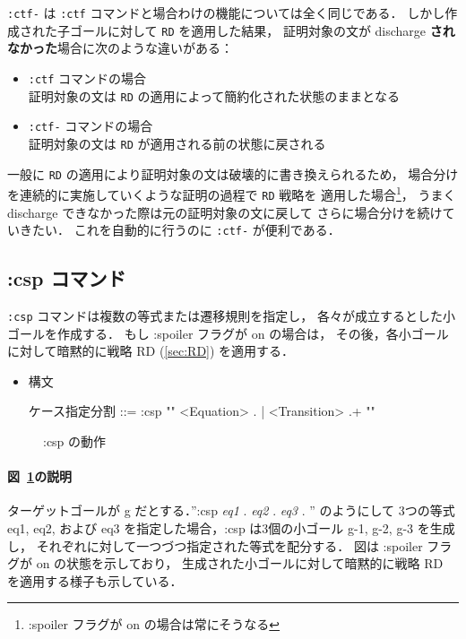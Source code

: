 \documentclass[a4paper,oneside,10pt,here]{memoir}
\newenvironment{vvtm}%
{\parskip=0pt\lineskip=0pt\begin{center}\begin{minipage}{0.8\textwidth}\begin{snugshade}}%
  {\end{snugshade}\end{minipage}\end{center}}
\begin{document}
\texttt{:ctf-} は \texttt{:ctf} コマンドと場合わけの機能については全く同じである．
しかし作成された子ゴールに対して \texttt{RD} を適用した結果，
証明対象の文が discharge \textbf{されなかった}場合に次のような違いがある：
\begin{itemize}
\item \texttt{:ctf} コマンドの場合\\
  証明対象の文は \texttt{RD} の適用によって簡約化された状態のままとなる
\item \texttt{:ctf-} コマンドの場合\\
  証明対象の文は \texttt{RD} が適用される前の状態に戻される
\end{itemize}

一般に \texttt{RD} の適用により証明対象の文は破壊的に書き換えられるため，
場合分けを連続的に実施していくような証明の過程で \texttt{RD} 戦略を
適用した場合\footnote{:spoiler フラグが on の場合は常にそうなる}，
うまく discharge できなかった際は元の証明対象の文に戻して
さらに場合分けを続けていきたい．
これを自動的に行うのに \texttt{:ctf-} が便利である．

\subsection{:csp コマンド}\label{sec:csp}
\texttt{:csp} コマンドは複数の等式または遷移規則を指定し，
各々が成立するとした小ゴールを作成する．
もし :spoiler フラグが on の場合は，
その後，各小ゴールに対して暗黙的に戦略 RD (\ref{sec:RD}) を適用する．

\begin{itemize}
\item 構文
  \begin{vvtm}
    \begin{simplev}
      ケース指定分割 ::= :csp "{" { <Equation> . | <Transition> .}+ "}"
    \end{simplev}
  \end{vvtm}
\end{itemize}

\begin{figure}[hbt]
  \centering
  
  \caption{:csp の動作}
  \label{fig:csp}
\end{figure}

\paragraph{図~\ref{fig:csp}の説明}
ターゲットゴールが g だとする．”:csp { \textit{eq1} . \textit{eq2} . \textit{eq3} . }” のようにして
3つの等式 eq1, eq2, および eq3 を指定した場合，:csp は3個の小ゴール g-1, g-2, g-3 を生成し，
それぞれに対して一つづつ指定された等式を配分する．
図は :spoiler フラグが on の状態を示しており，
生成された小ゴールに対して暗黙的に戦略 RD を適用する様子も示している．
\end{document}
